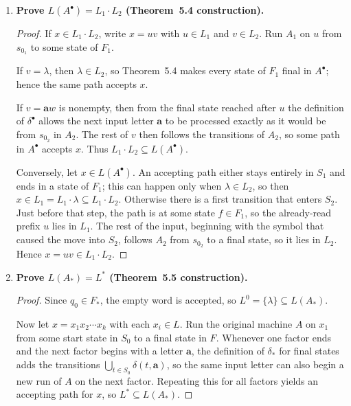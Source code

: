 \begin{enumerate}[{5.}1. ]
\textbf{Counterexample.}  Again use $I_\Sigma$, the infinite languages.
Exercise~5.4(b) shows it is closed under union, while Exercise~5.4(c) shows it
is not closed under intersection.

\item \textbf{Prove $L(A^\bullet)=L_1\cdot L_2$ (Theorem~5.4 construction).}

\begin{proof}
If $x\in L_1\cdot L_2$, write $x=uv$ with $u\in L_1$ and $v\in L_2$.
Run $A_1$ on $u$ from $s_{0_1}$ to some state of $F_1$.

If $v=\lambda$, then $\lambda\in L_2$, so Theorem~5.4 makes every state of
$F_1$ final in $A^\bullet$; hence the same path accepts $x$.

If $v=\pmb{a}w$ is nonempty, then from the final state reached after $u$ the
definition of $\delta^\bullet$ allows the next input letter $\pmb{a}$ to be
processed exactly as it would be from $s_{0_2}$ in $A_2$.  The rest of $v$ then
follows the transitions of $A_2$, so some path in $A^\bullet$ accepts $x$.
Thus $L_1\cdot L_2\subseteq L(A^\bullet)$.

Conversely, let $x\in L(A^\bullet)$.  An accepting path either stays entirely in
$S_1$ and ends in a state of $F_1$; this can happen only when $\lambda\in L_2$,
so then $x\in L_1=L_1\cdot\lambda\subseteq L_1\cdot L_2$.  Otherwise there is a
first transition that enters $S_2$.  Just before that step, the path is at some
state $f\in F_1$, so the already-read prefix $u$ lies in $L_1$.  The rest of the
input, beginning with the symbol that caused the move into $S_2$, follows
$A_2$ from $s_{0_2}$ to a final state, so it lies in $L_2$.  Hence
$x=uv\in L_1\cdot L_2$.
\end{proof}

\item \textbf{Prove $L(A_*)=L^*$ (Theorem~5.5 construction).}

\begin{proof}
Since $q_0\in F_*$, the empty word is accepted, so $L^0=\{\lambda\}\subseteq L(A_*)$.

Now let $x=x_1x_2\cdots x_k$ with each $x_i\in L$.  Run the original machine $A$
on $x_1$ from some start state in $S_0$ to a final state in $F$.  Whenever one
factor ends and the next factor begins with a letter $\pmb{a}$, the definition of
$\delta_*$ for final states adds the transitions
$\bigcup_{t\in S_0}\delta(t,\pmb{a})$, so the same input letter can also begin a
new run of $A$ on the next factor.  Repeating this for all factors yields an
accepting path for $x$, so $L^*\subseteq L(A_*)$.


\end{proof}
\end{enumerate}
